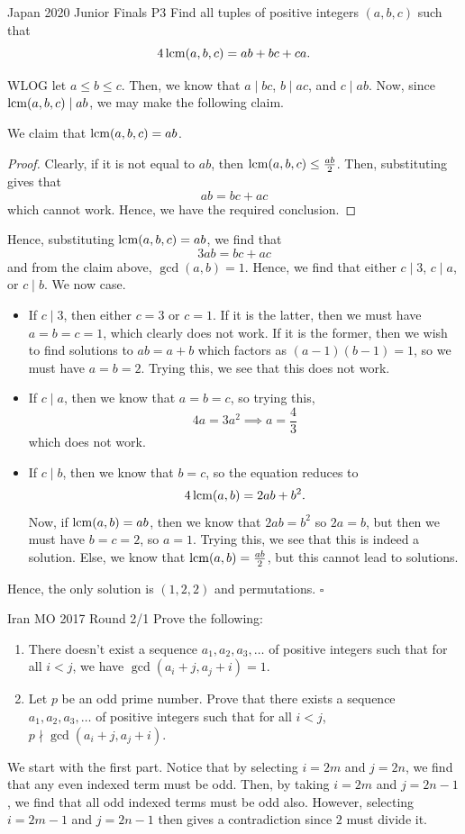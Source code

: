\documentclass{article}
\begin{document}
\begin{problem}[1.12.10]{Japan 2020 Junior Finals P3}
Find all tuples of positive integers $(a, b, c)$ such that \[4\operatorname{lcm}(a, b, c) = ab + bc + ca.\]
\end{problem}
WLOG let $a \le b \le c$. Then, we know that $a \mid bc$, $b \mid ac$, and $c \mid ab$. Now, since $\operatorname{lcm}(a, b, c) \mid ab$, we may make the following claim.
\begin{claim*}
We claim that $\operatorname{lcm}(a, b, c) = ab$.
\end{claim*}
\begin{proof}
Clearly, if it is not equal to $ab$, then $\operatorname{lcm}(a, b, c) \le \tfrac{ab}{2}$. Then, substituting gives that \[ab = bc+ac\] which cannot work. Hence, we have the required conclusion.
\end{proof}
Hence, substituting $\operatorname{lcm}(a, b, c) = ab$, we find that \[3ab = bc+ac\] and from the claim above, $\gcd(a, b) = 1$. Hence, we find that either $c \mid 3$, $c \mid a$, or $c \mid b$. We now case.
\begin{itemize}
\item If $c \mid 3$, then either $c = 3$ or $c = 1$. If it is the latter, then we must have $a = b = c = 1$, which clearly does not work. If it is the former, then we wish to find solutions to $ab = a+b$ which factors as $(a-1)(b-1) = 1$, so we must have $a = b = 2$. Trying this, we see that this does not work.
\item If $c \mid a$, then we know that $a = b = c$, so trying this, \[4a = 3a^2 \implies a = \dfrac{4}{3}\] which does not work.
\item If $c \mid b$, then we know that $b = c$, so the equation reduces to \[4\operatorname{lcm}(a, b) = 2ab+b^2.\] Now, if $\operatorname{lcm}(a, b) = ab$, then we know that $2ab = b^2$ so $2a = b$, but then we must have $b = c = 2$, so $a = 1$. Trying this, we see that this is indeed a solution. Else, we know that $\operatorname{lcm}(a, b) = \tfrac{ab}{2}$, but this cannot lead to solutions.
\end{itemize}
Hence, the only solution is $\boxed{(1, 2, 2)}$ and permutations. $\square$

\newpage

\begin{problem}[1.12.11]{Iran MO 2017 Round 2/1}
Prove the following:
\begin{enumerate}
\item There doesn't exist a sequence $a_1, a_2, a_3, \dots$ of positive integers such that for all $i < j$, we have $\gcd(a_i + j, a_j + i) = 1$.
\item Let $p$ be an odd prime number. Prove that there exists a sequence $a_1, a_2, a_3, \dots$ of positive integers such that for all $i < j$, $p \nmid \gcd(a_i + j, a_j + i)$.
\end{enumerate}
\end{problem}
We start with the first part. Notice that by selecting $i = 2m$ and $j = 2n$, we find that any even indexed term must be odd. Then, by taking $i = 2m$ and $j = 2n-1$, we find that all odd indexed terms must be odd also. However, selecting $i = 2m-1$ and $j = 2n-1$ then gives a contradiction since $2$ must divide it.
\end{document}
